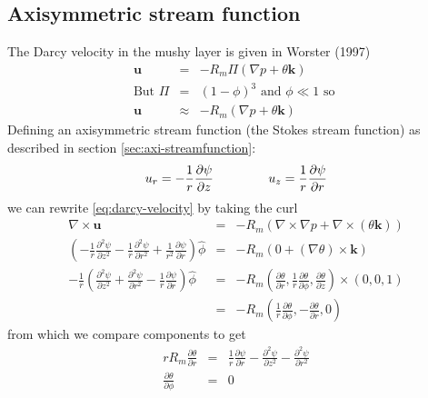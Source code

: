\documentclass{article}
\begin{document}
\subsection{Axisymmetric stream function}
The Darcy velocity in the mushy layer is given in Worster (1997)
\begin{eqnarray}
\mathbf{u} &=& - R_m \Pi  (\nabla p + \theta \mathbf{k} ) \\
\text{But } \Pi &=& (1 - \phi)^3 \text{ and } \phi \ll 1 \text{ so } \\
\mathbf{u} &\approx& - R_m (\nabla p + \theta \mathbf{k} ) \label{eq:darcy-velocity}
\end{eqnarray}
Defining an axisymmetric stream function (the Stokes stream function) as described in section \ref{sec:axi-streamfunction}:
\begin{eqnarray}
u_r = - \frac{1}{r} \frac{\partial \psi}{\partial z} \hspace{10ex} u_z = \frac{1}{r} \frac{\partial \psi}{\partial r}
\end{eqnarray}
we can rewrite \eqref{eq:darcy-velocity} by taking the curl
\begin{eqnarray}
\nabla \times \mathbf{u} &=& - R_m ( \nabla \times \nabla p + \nabla \times (\theta \mathbf{k} ) ) \\
\left ( -\frac{1}{r} \frac{\partial^2 \psi}{\partial z^2} - \frac{1}{r} \frac{\partial^2 \psi}{\partial r^2} + \frac{1}{r^2} \frac{\partial \psi}{\partial r} \right) \hat{\phi} &=& 
-R_m (0 + (\nabla \theta) \times \mathbf{k} ) \\
- \frac{1}{r} \left ( \frac{\partial^2 \psi}{\partial z^2} + \frac{\partial^2 \psi}{\partial r^2} - \frac{1}{r} \frac{\partial \psi}{\partial r} \right) \hat{\phi}   &=& 
-R_m \left( \frac{\partial \theta}{\partial r}, \frac{1}{r} \frac{\partial \theta}{\partial \phi}, \frac{\partial\theta}{\partial z} \right) \times (0, 0, 1) \\
&=& - R_m \left(\frac{1}{r} \frac{\partial \theta}{\partial \phi} , - \frac{\partial \theta}{\partial r} , 0 \right)
\end{eqnarray}
from which we compare components to get
\begin{eqnarray}
r R_m \frac{\partial \theta}{\partial r} &=& \frac{1}{r} \frac{\partial \psi}{\partial r}   - \frac{\partial^2 \psi}{\partial z^2} - \frac{\partial^2 \psi}{\partial r^2} \label{eq:momentum-mushy-layer}\\
 \frac{\partial \theta}{\partial \phi} &=& 0
\end{eqnarray}
\end{document}
